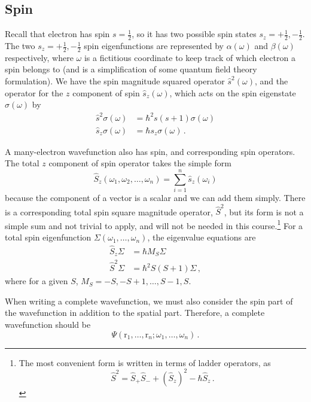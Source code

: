 \documentclass{article}
\theoremstyle{plain}\theoremheaderfont{\normalfont\itshape}\theorembodyfont{\rmfamily}\theoremseparator{.}\newtheorem*{rem}{Remark}\newtheorem*{ex}{Example}\newtheorem*{proof}{Proof}\newtheorem*{altp}{Alternative proof}
\theoremstyle{plain}\theoremheaderfont{\normalfont\bfseries}\theorembodyfont{\rmfamily}\theoremseparator{.}\newtheorem{thm}{Theorem}[section]\newtheorem{lem}[thm]{Lemma}\newtheorem{prop}[thm]{Proposition}\newtheorem*{cor}{Corollary}\newtheorem{defn}[thm]{Definition}\newtheorem{clm}[thm]{Claim}\newtheorem{clminproof}{Claim}\newtheorem{pos}{Postulate}[section]
\theoremstyle{break}\theoremheaderfont{\normalfont\itshape}\theorembodyfont{\rmfamily}\theoremseparator{.\medskip}\newtheorem*{proofskip}{Proof}\newtheorem*{exs}{Examples}\newtheorem*{rems}{Remarks}
\theoremstyle{break}\theoremheaderfont{\normalfont\bfseries}\theorembodyfont{\rmfamily}\theoremseparator{.\medskip}\newtheorem{lemskip}[thm]{Lemma}\newtheorem{defnskip}[thm]{Definition}\newtheorem{propskip}[thm]{Proposition}\newtheorem{thmskip}[thm]{Theorem}
\numberwithin{equation}{section}
\newcommand{\vb}[1]{\bm{\mathrm{#1}}}
\begin{document}
    \subsection{Spin}
    Recall that electron has spin \(s=\frac{1}{2}\), so it has two possible spin states \(s_z=+\frac{1}{2},-\frac{1}{2}\). The two \(s_z=+\frac{1}{2},-\frac{1}{2}\) spin eigenfunctions are represented by \(\alpha(\omega)\) and \(\beta(\omega)\) respectively, where \(\omega\) is a fictitious coordinate to keep track of which electron a spin belongs to (and is a simplification of some quantum field theory formulation). We have the spin magnitude squared operator \(\hat{s}^2(\omega)\), and the operator for the \(z\) component of spin \(\hat{s}_z(\omega)\), which acts on the spin eigenstate \(\sigma(\omega)\) by
    \begin{align}
        \hat{s}^2\sigma(\omega)&=\hbar^2s(s+1)\sigma(\omega)\\
        \hat{s}_z\sigma(\omega)&=\hbar s_z\sigma(\omega)\,.
    \end{align}

    A many-electron wavefunction also has spin, and corresponding spin operators. The total \(z\) component of spin operator takes the simple form
    \begin{equation}
        \hat{S}_z(\omega_1,\omega_2,\dots,\omega_n)=\sum_{i=1}^{n}\hat{s}_z(\omega_i)
    \end{equation}
    because the component of a vector is a scalar and we can add them simply. There is a corresponding total spin square magnitude operator, \(\hat{S}^2\), but its form is not a simple sum and not trivial to apply, and will not be needed in this course.\footnote{The most convenient form is written in terms of ladder operators, as
    \begin{equation}
        \hat{S}^2=\hat{S}_+\hat{S}_-+(\hat{S}_z)^2-\hbar\hat{S}_z\,.
    \end{equation}}
    For a total spin eigenfunction \(\Sigma(\omega_1,\dots,\omega_n)\), the eigenvalue equations are
    \begin{align}
        \hat{S}_z\Sigma&=\hbar M_S\Sigma\\
        \hat{S}^2\Sigma&=\hbar^2 S(S+1)\Sigma\,,
    \end{align}
    where for a given \(S\), \(M_S=-S,-S+1,\dots,S-1,S\).

    When writing a complete wavefunction, we must also consider the spin part of the wavefunction in addition to the spatial part. Therefore, a complete wavefunction should be
    \begin{equation}
        \Psi(\vb{r}_1,\dots,\vb{r}_n;\omega_1,\dots,\omega_n)\,.
    \end{equation}
\end{document}
